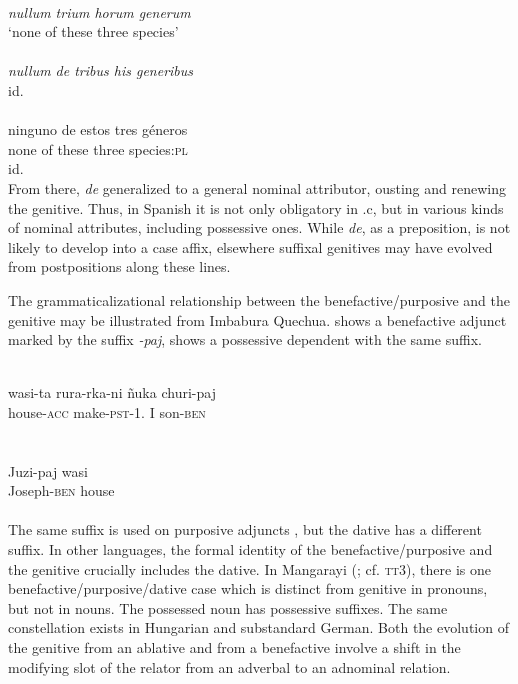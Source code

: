 \ea \label{ex:E46} 
\ea {} \\ 
{\itshape nullum trium horum generum}\\
\glt ‘none of these three species’\\
\ex  {} \\
{\itshape nullum de tribus his generibus}\\
\glt id. \\
\ex
{} \\
\gll  ninguno  de  estos  tres géneros \\
   none  of  these  three  species:\textsc{pl}  \\
 \glt id.\\
\z
\z
\noindent From there, \textit{de} generalized to a general nominal attributor, ousting and renewing the genitive. Thus, in Spanish it is not only obligatory in .c, but in various kinds of nominal attributes, including possessive ones. While \textit{de}, as a preposition, is not likely to develop into a case affix, elsewhere suffixal genitives may have evolved from postpositions along these lines.

The grammaticalizational relationship between the benefactive/purposive and the genitive may be illustrated from Imbabura Quechua.  shows a benefactive adjunct marked by the suffix \textit{{}-paj},  shows a possessive dependent with the same suffix.\label{page79}

\ea\label{ex:E47}
\\
\gll  wasi-ta  rura-rka-ni  ñuka  churi-paj\\
 house-\textsc{acc}  {make-\textsc{pst}-1.\glsg}  I  son-\textsc{ben}\\
\\
\z
\noindent \ea\label{ex:E48}
 \\
\gll   Juzi-paj  wasi\\
Joseph-\textsc{ben}  house\\
\\
\z
\noindent The same suffix is used on purposive adjuncts \citep[116f]{Cole1982}, but the dative has a different suffix. In other languages, the formal identity of the benefactive/purposive and the genitive crucially includes the dative. In Mangarayi (\citealt[66--76]{Merlan1982}; cf. \textsc{tt}3), there is one benefactive/purposive/dative case which is distinct from genitive in pronouns, but not in nouns. The possessed noun has possessive suffixes. The same constellation exists in Hungarian and substandard German. Both the evolution of the genitive from an ablative and from a benefactive involve a shift in the modifying slot of the relator from an adverbal to an adnominal relation.


